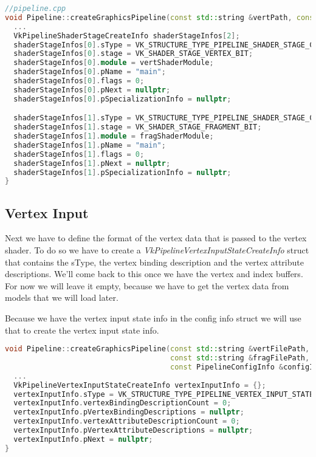 \documentclass[12pt]{report} \usepackage{preamble}
\begin{document}
\begin{lstlisting}[language=C++]
//pipeline.cpp
void Pipeline::createGraphicsPipeline(const std::string &vertPath, const std::string &fragPath, const PipelineConfigInfo &configInfo) {
  ...
  VkPipelineShaderStageCreateInfo shaderStageInfos[2];
  shaderStageInfos[0].sType = VK_STRUCTURE_TYPE_PIPELINE_SHADER_STAGE_CREATE_INFO;
  shaderStageInfos[0].stage = VK_SHADER_STAGE_VERTEX_BIT;
  shaderStageInfos[0].module = vertShaderModule;
  shaderStageInfos[0].pName = "main";
  shaderStageInfos[0].flags = 0;
  shaderStageInfos[0].pNext = nullptr;
  shaderStageInfos[0].pSpecializationInfo = nullptr;

  shaderStageInfos[1].sType = VK_STRUCTURE_TYPE_PIPELINE_SHADER_STAGE_CREATE_INFO;
  shaderStageInfos[1].stage = VK_SHADER_STAGE_FRAGMENT_BIT;
  shaderStageInfos[1].module = fragShaderModule;
  shaderStageInfos[1].pName = "main";
  shaderStageInfos[1].flags = 0;
  shaderStageInfos[1].pNext = nullptr;
  shaderStageInfos[1].pSpecializationInfo = nullptr;
}
\end{lstlisting}

\subsection{Vertex Input}

Next we have to define the format of the vertex data that is passed to the vertex shader. To do so we have to create a
\textit{VkPipelineVertexInputStateCreateInfo} struct that contains the sType, the vertex binding description and the vertex
attribute descriptions. We'll come back to this once we have the vertex and index buffers. For now we will leave it empty,
because we have to get the vertex data from models that we will load later.

Because we have the vertex input state info in the config info struct we will use that to create the vertex input state info.

\begin{lstlisting}[language=C++]
void Pipeline::createGraphicsPipeline(const std::string &vertFilePath,
                                      const std::string &fragFilePath,
                                      const PipelineConfigInfo &configInfo) {
  ...
  VkPipelineVertexInputStateCreateInfo vertexInputInfo = {};
  vertexInputInfo.sType = VK_STRUCTURE_TYPE_PIPELINE_VERTEX_INPUT_STATE_CREATE_INFO;
  vertexInputInfo.vertexBindingDescriptionCount = 0;
  vertexInputInfo.pVertexBindingDescriptions = nullptr;
  vertexInputInfo.vertexAttributeDescriptionCount = 0;
  vertexInputInfo.pVertexAttributeDescriptions = nullptr;
  vertexInputInfo.pNext = nullptr;
}
\end{lstlisting}
\end{document}
